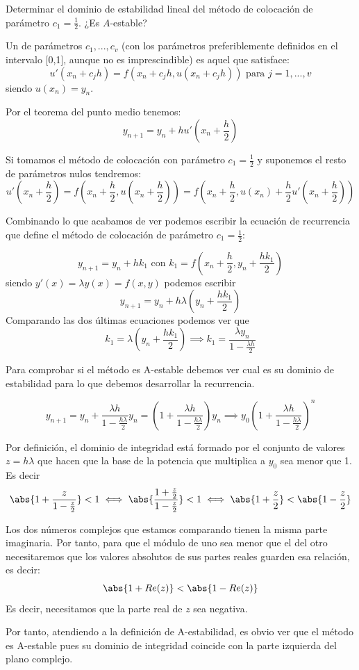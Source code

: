 \begin{problem}[1]
Determinar el dominio de estabilidad lineal del método de colocación de parámetro $c_1=\frac{1}{2}$. ¿Es $A$-estable?
\solution

Un  de parámetros $c_1,...,c_v$ (con los parámetros preferiblemente definidos en el intervalo [0,1], aunque no es imprescindible) es aquel que satisface:
\[u'(x_n+c_jh)=f(x_n+c_jh,u(x_n+c_jh)) \text{ para } j=1,...,v\]
siendo $u(x_n)=y_n$.

Por el teorema del punto medio tenemos:
\[y_{n+1}=y_n+hu'\left(x_n+\frac{h}{2}\right)\]

Si tomamos el método de colocación con parámetro $c_1=\frac{1}{2}$ y suponemos el resto de parámetros nulos tendremos:
\[u'\left(x_n+\frac{h}{2}\right)=f\left(x_n+\frac{h}{2},u\left(x_n+\frac{h}{2}\right)\right) =f\left(x_n+\frac{h}{2},u(x_n) + \frac{h}{2}u'\left(x_n+\frac{h}{2}\right)\right)\]

Combinando lo que acabamos de ver podemos escribir la ecuación de recurrencia que define el método de colocación de parámetro $c_1=\frac{1}{2}$:

\[y_{n+1} = y_n + hk_1 \text{ con } k_1 = f\left( x_n +\frac{h}{2}, y_n + \frac{hk_1}{2}\right)\]
siendo $y'(x)=λy(x)=f(x,y)$ podemos escribir
\[y_{n+1} = y_n + hλ\left(y_n+\frac{hk_1}{2}\right)\]
Comparando las dos últimas ecuaciones podemos ver que
\[k_1 = λ\left( y_n + \frac{hk_1}{2}\right) \implies k_1 = \frac{λy_n}{1-\frac{λh}{2}}\]

Para comprobar si el método es A-estable debemos ver cual es su dominio de estabilidad para lo que debemos desarrollar la recurrencia.

\[y_{n+1} = y_n + \frac{λh}{1-\frac{hλ}{2}}y_n = \left(1+ \frac{λh}{1-\frac{hλ}{2}}\right)y_n \implies y_0\left(1+ \frac{λh}{1-\frac{hλ}{2}}\right)^n\]

Por definición, el dominio de integridad está formado por el conjunto de valores $z=hλ$ que hacen que la base de la potencia que multiplica a $y_0$ sea menor que 1. Es decir
\[\abs{1+\frac{z}{1-\frac{z}{2}}} < 1 \iff \abs{\frac{1+\frac{z}{2}}{1-\frac{z}{2}}} < 1 \iff \abs{1+\frac{z}{2}} < \abs{1-\frac{z}{2}}\]

Los dos números complejos que estamos comparando tienen la misma parte imaginaria. Por tanto, para que el módulo de uno sea menor que el del otro necesitaremos que los valores absolutos de sus partes reales guarden esa relación, es decir:
\[\abs{1+Re(z)} < \abs{1 - Re(z)}\]
Es decir, necesitamos que la parte real de $z$ sea negativa.

Por tanto, atendiendo a la definición de A-estabilidad, es obvio ver que el método es A-estable pues su dominio de integridad coincide con la parte izquierda del plano complejo.
\end{problem}

